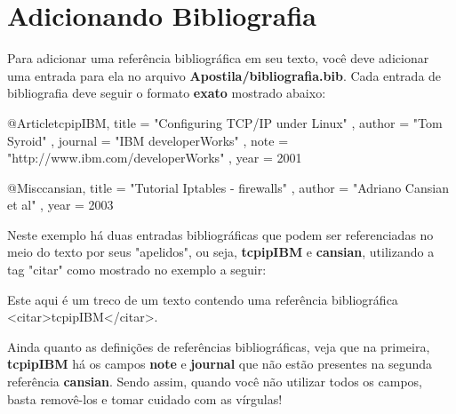 \newpage \chapter{Adicionando Bibliografia}\setcounter{SteP}{1}

Para adicionar uma referência bibliográfica em seu texto, você deve adicionar
uma entrada para ela no arquivo {\bf Apostila/bibliografia.bib}. Cada entrada
de bibliografia deve seguir o formato {\bf exato} mostrado abaixo:

\begin{BoxVerbatim}
@Article{tcpipIBM,
    title   =   "Configuring {TCP}/{IP} under Linux" ,
    author  =   "Tom Syroid" ,
    journal =   "{IBM} developerWorks" ,
    note    =   "http://www.ibm.com/developerWorks" ,
    year    =   2001
}

@Misc{cansian,
    title   =   "Tutorial Iptables - firewalls" ,
    author  =   "Adriano Cansian et al" ,
    year    =   2003 
}
\end{BoxVerbatim}

Neste exemplo há duas entradas bibliográficas que podem ser referenciadas no
meio do texto por seus "apelidos", ou seja, {\bf tcpipIBM} e {\bf cansian},
utilizando a tag "citar" como mostrado no exemplo a seguir:

\begin{BoxVerbatim}
 Este aqui é um treco de um texto contendo uma referência
 bibliográfica <citar>tcpipIBM</citar>.
\end{BoxVerbatim}

Ainda quanto as definições de referências bibliográficas, veja que na primeira,
{\bf tcpipIBM} há os campos {\bf note} e {\bf journal} que não estão
presentes na segunda referência {\bf cansian}. Sendo assim, quando você não
utilizar todos os campos, basta removê-los e tomar cuidado com as vírgulas!
